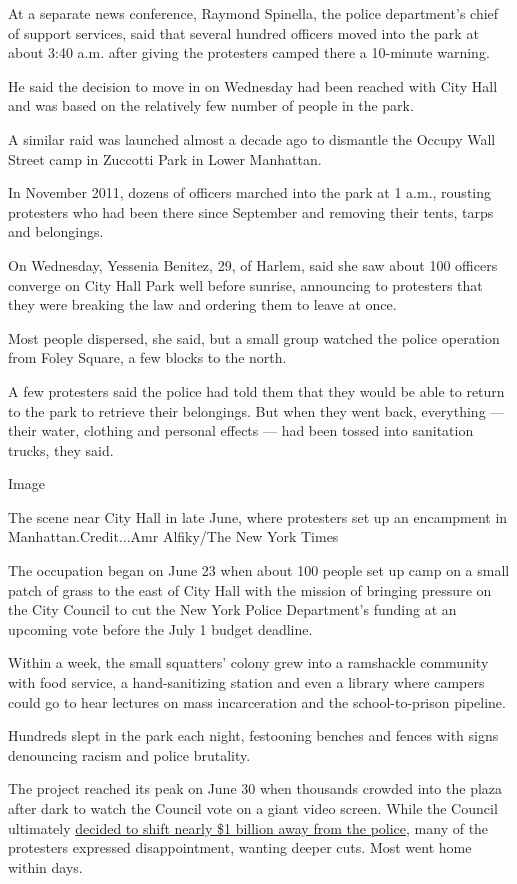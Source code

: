 At a separate news conference, Raymond Spinella, the police department's
chief of support services, said that several hundred officers moved into
the park at about 3:40 a.m. after giving the protesters camped there a
10-minute warning.

He said the decision to move in on Wednesday had been reached with City
Hall and was based on the relatively few number of people in the park.

A similar raid was launched almost a decade ago to dismantle the Occupy
Wall Street camp in Zuccotti Park in Lower Manhattan.

In November 2011, dozens of officers marched into the park at 1 a.m.,
rousting protesters who had been there since September and removing
their tents, tarps and belongings.

On Wednesday, Yessenia Benitez, 29, of Harlem, said she saw about 100
officers converge on City Hall Park well before sunrise, announcing to
protesters that they were breaking the law and ordering them to leave at
once.

Most people dispersed, she said, but a small group watched the police
operation from Foley Square, a few blocks to the north.

A few protesters said the police had told them that they would be able
to return to the park to retrieve their belongings. But when they went
back, everything --- their water, clothing and personal effects --- had
been tossed into sanitation trucks, they said.

Image

The scene near City Hall in late June, where protesters set up an
encampment in Manhattan.Credit...Amr Alfiky/The New York Times

The occupation began on June 23 when about 100 people set up camp on a
small patch of grass to the east of City Hall with the mission of
bringing pressure on the City Council to cut the New York Police
Department's funding at an upcoming vote before the July 1 budget
deadline.

Within a week, the small squatters' colony grew into a ramshackle
community with food service, a hand-sanitizing station and even a
library where campers could go to hear lectures on mass incarceration
and the school-to-prison pipeline.

Hundreds slept in the park each night, festooning benches and fences
with signs denouncing racism and police brutality.

The project reached its peak on June 30 when thousands crowded into the
plaza after dark to watch the Council vote on a giant video screen.
While the Council ultimately
\href{https://www.nytimes3xbfgragh.onion/2020/06/30/nyregion/nypd-budget.html}{decided
to shift nearly \$1 billion away from the police}, many of the
protesters expressed disappointment, wanting deeper cuts. Most went home
within days.

